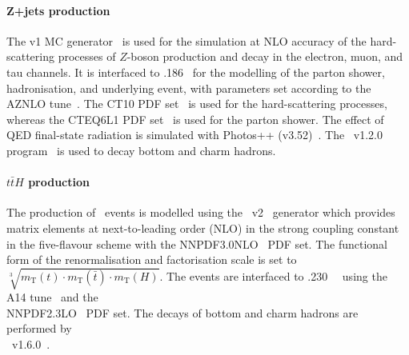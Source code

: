 \paragraph{Z+jets production}     
The \powhegbox v1 MC generator~\cite{Nason:2004rx,Frixione:2007vw,Alioli:2010xd,Alioli:2008gx}
is used for the simulation at NLO accuracy of the hard-scattering processes of 
$Z$-boson production and decay in the electron, muon, and tau
channels. It is interfaced to \pythia{}.186~\cite{Sjostrand:2007gs}
for the modelling of the parton shower, hadronisation, and underlying
event, with parameters set according to the AZNLO
tune~\cite{STDM-2012-23}. The CT10 PDF set~\cite{Lai:2010vv} is used
for the hard-scattering processes, whereas the CTEQ6L1 PDF
set~\cite{Pumplin:2002vw} is used for the parton shower. The effect of
QED final-state radiation is simulated with Photos++
(v3.52)~\cite{Golonka:2005pn,Davidson:2010ew}. The \evtgen~v1.2.0
program~\cite{Lange:2001uf} is used to decay bottom and charm hadrons.

\paragraph{$t\bar{t}H$ production}
The production of \ttH\ events is modelled using the
\powhegbox~v2~\cite{Frixione:2007nw,Nason:2004rx,Frixione:2007vw,Alioli:2010xd,Hartanto:2015uka}
generator which provides matrix elements at next-to-leading order (NLO) in the strong coupling 
constant \alphas in the five-flavour scheme with the \textsc{NNPDF3.0NLO}~\cite{Ball:2014uwa} PDF set.
The functional form of the renormalisation and factorisation scale is 
set to $\sqrt[3]{m_\text{T}(t)\cdot m_\text{T}(\bar{t}) \cdot m_\text{T}(H)}$.
The events are interfaced to \pythia.230~\cite{Sjostrand:2014zea}~
using the A14 tune~\cite{ATL-PHYS-PUB-2014-021} and the
\\ \textsc{NNPDF2.3LO}~\cite{Ball:2014uwa} PDF set. The decays of bottom and charm hadrons
are performed by\\ \evtgen~v1.6.0~\cite{Lange:2001uf}.


